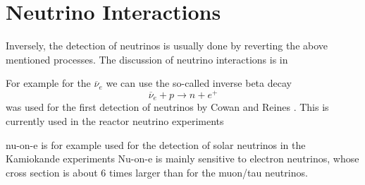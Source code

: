 
\section{Neutrino Interactions}
Inversely, the detection of neutrinos is usually done by reverting the above mentioned processes. The discussion of neutrino interactions is in \cite{NeutrinoIntOverview2012.pdf}

For example for the $\overline{\nu}_e$ we can use the so-called inverse beta decay
\begin{equation}
\overline{\nu}_e +p\rightarrow n+e^+
\end{equation}
was used for the first detection of neutrinos by Cowan and Reines \cite{CowanReinesFirstAttempt.pdf, CowanReinesConfirmation.pdf}. This is currently used in the reactor neutrino experiments 

\cite{FundamentalsOfNeutrinoPhysics.pdf} 
nu-on-e is for example used for the detection of solar neutrinos in the Kamiokande experiments
Nu-on-e is mainly sensitive to electron neutrinos, whose cross section is about 6 times larger than for the muon/tau neutrinos.


